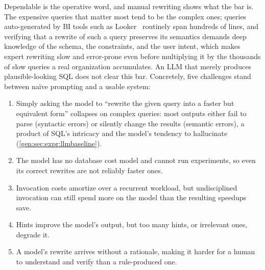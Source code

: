 Dependable is the operative word, and manual rewriting shows what the
bar is. The expensive queries that matter most tend to be the complex
ones; queries auto-generated by BI tools such as
Looker~\cite{lookergoogle} routinely span hundreds of lines, and
verifying that a rewrite of such a query preserves its semantics
demands deep knowledge of the schema, the constraints, and the user
intent, which makes expert rewriting slow and error-prone even before
multiplying it by the thousands of slow queries a real organization
accumulates. An LLM that merely produces plausible-looking SQL does
not clear this bar. Concretely, five challenges stand between na\"ive
prompting and a usable system:
\begin{enumerate}[label=C\arabic*, leftmargin=0.5cm]

\item Simply asking the model to ``rewrite the given query into a
faster but equivalent form'' collapses on complex queries: most
outputs either fail to parse (syntactic errors) or silently change the
results (semantic errors), a product of SQL's intricacy and the
model's tendency to hallucinate (\cref{gen:sec:expr:llmbaseline}).

\item The model has no database cost model and cannot run experiments,
so even its correct rewrites are not reliably faster ones.

\item Invocation costs amortize over a recurrent workload, but
undisciplined invocation can still spend more on the model than the
resulting speedups save.

\item Hints improve the model's output, but too many hints, or
irrelevant ones, degrade it.

\item A model's rewrite arrives without a rationale, making it harder
for a human to understand and verify than a rule-produced one.

\end{enumerate}

